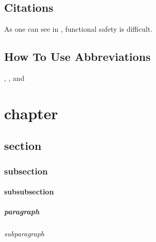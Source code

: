 \clearpage

\section{Citations}
\label{sec: Citations}

As one can see in \cite{iso_13849_part1}, functional safety is difficult.


\nocite{iso_13849_part1}
\nocite{iso_13849_part2}
\nocite{iso_12100}
\nocite{ISO:online}
\nocite{IEC:online}
\nocite{DIN:online}
\nocite{Isermann2010}
\nocite{francke2015internet}

\section{How To Use Abbreviations}

, , and 




\chapter{chapter}
\section{section}
\subsection{subsection}
\subsubsection{subsubsection}
\paragraph{paragraph}
\subparagraph{subparagraph}


